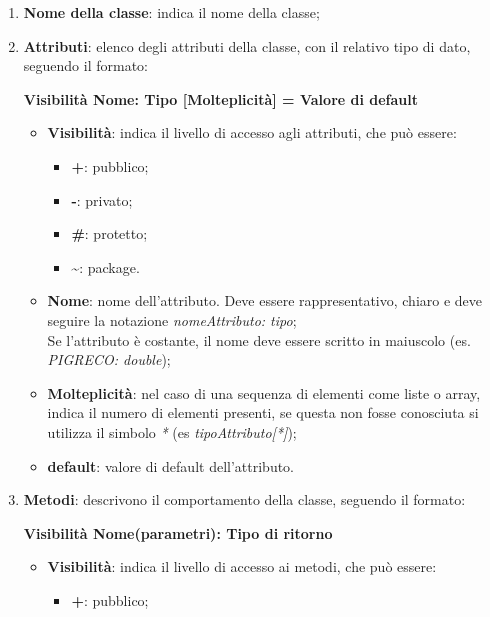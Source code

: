 \begin{enumerate}
	\item \textbf{Nome della classe}: indica il nome della classe;
	\item \textbf{Attributi}: elenco degli attributi della classe, con il relativo tipo di dato, seguendo il formato: \\ \begin{center}\textbf{Visibilità Nome: Tipo [Molteplicità] = Valore di default}\end{center}
	      \begin{itemize}
		      \item \textbf{Visibilità}: indica il livello di accesso agli attributi, che può essere:
		            \begin{itemize}
			            \item \textbf{+}: pubblico;
			            \item \textbf{-}: privato;
			            \item \textbf{\#}: protetto;
			            \item \textbf{\textasciitilde}: package.
		            \end{itemize}
		      \item \textbf{Nome}: nome dell'attributo. Deve essere rappresentativo, chiaro e deve seguire la notazione \textit{nomeAttributo: tipo}; \\ Se l'attributo è costante, il nome deve essere scritto in maiuscolo (es. \textit{PIGRECO: double});
		      \item \textbf{Molteplicità}: nel caso di una sequenza di elementi come liste o array, indica il numero di elementi presenti, se questa non fosse conosciuta si utilizza il simbolo \textit{*} (es \textit{tipoAttributo[*]});
		      \item \textbf{default}: valore di default dell'attributo.
	      \end{itemize}
	\item \textbf{Metodi}: descrivono il comportamento della classe, seguendo il formato: \\ \begin{center}\textbf{Visibilità Nome(parametri): Tipo di ritorno}\end{center}
	      \begin{itemize}
		      \item \textbf{Visibilità}: indica il livello di accesso ai metodi, che può essere:
		            \begin{itemize}
			            \item \textbf{+}: pubblico;

\end{itemize}
\end{itemize}
\end{enumerate}
